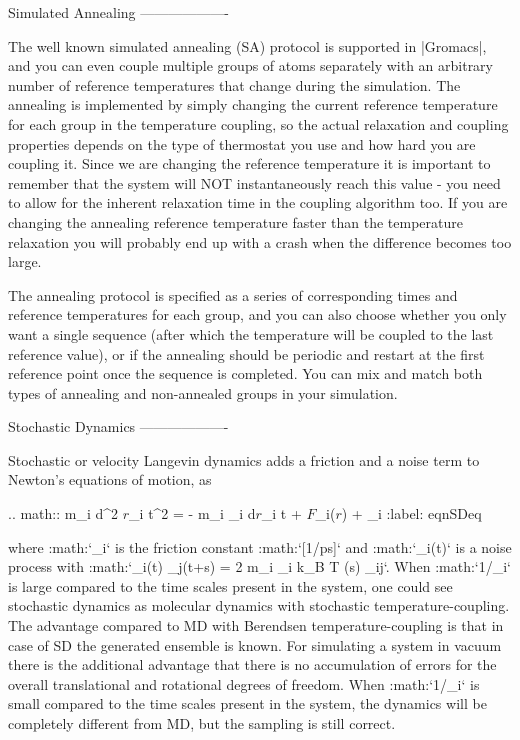 {Simulated Annealing
-------------------

The well known simulated
annealing
(SA) protocol is supported in |Gromacs|, and you can even couple multiple
groups of atoms separately with an arbitrary number of reference
temperatures that change during the simulation. The annealing is
implemented by simply changing the current reference temperature for
each group in the temperature coupling, so the actual relaxation and
coupling properties depends on the type of thermostat you use and how
hard you are coupling it. Since we are changing the reference
temperature it is important to remember that the system will NOT
instantaneously reach this value - you need to allow for the inherent
relaxation time in the coupling algorithm too. If you are changing the
annealing reference temperature faster than the temperature relaxation
you will probably end up with a crash when the difference becomes too
large.

The annealing protocol is specified as a series of corresponding times
and reference temperatures for each group, and you can also choose
whether you only want a single sequence (after which the temperature
will be coupled to the last reference value), or if the annealing should
be periodic and restart at the first reference point once the sequence
is completed. You can mix and match both types of annealing and
non-annealed groups in your simulation.

Stochastic Dynamics
-------------------

Stochastic or velocity Langevin
dynamics
adds a friction and a noise term to Newton’s equations of motion, as

.. math::  m_i {{\mbox{d}}^2 {\mbox{\boldmath ${r}$}}_i t^2} =
           - m_i \gamma_i {{\mbox{d}}{\mbox{\boldmath ${r}$}}_i t} + {\mbox{\boldmath ${F}$}}_i({\mbox{\boldmath ${r}$}}) + {}_i
           :label: eqnSDeq

where :math:`\gamma_i` is the friction constant :math:`[1/\mbox{ps}]`
and :math:`{}_i\!\!(t)` is a
noise process with
:math:`_i\!\!(t) {}_j\!\!(t+s) \rangle = 2 m_i \gamma_i k_B T \delta(s) \delta_{ij}`. When :math:`1/\gamma_i`
is large compared to the time scales present in the system, one could
see stochastic dynamics as molecular dynamics with stochastic
temperature-coupling. The advantage compared to MD with Berendsen
temperature-coupling is that in case of SD the generated ensemble is
known. For simulating a system in vacuum there is the additional
advantage that there is no accumulation of errors for the overall
translational and rotational degrees of freedom. When :math:`1/\gamma_i`
is small compared to the time scales present in the system, the dynamics
will be completely different from MD, but the sampling is still correct.

}
